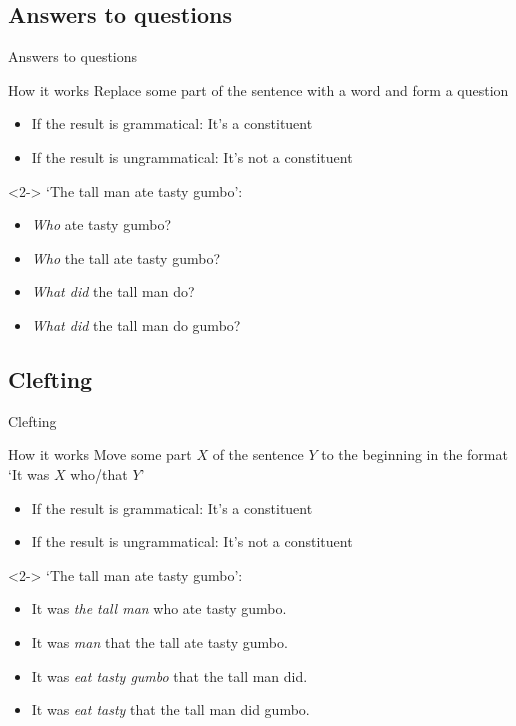 \documentclass{beamer}
\newcommand{\subonetwo}{Answers to questions}
\newcommand{\subonethree}{Clefting}
\begin{document}
    \subsection{\subonetwo}
      \begin{frame}{\subonetwo}
        \begin{block}{How it works}
          Replace some part of the sentence with a  word and form a question
          \begin{itemize}
            \item If the result is grammatical: It's a constituent
            \item If the result is ungrammatical: It's not a constituent
          \end{itemize}
        \end{block}
        \begin{example}<2->
          `The tall man ate tasty gumbo':
          \begin{itemize}
            \item \emph{Who} ate tasty gumbo?
            \item \emph{Who} the tall ate tasty gumbo?
            \item \emph{What did} the tall man do?
            \item \emph{What did} the tall man do gumbo?
          \end{itemize}
        \end{example}
      \end{frame}

    \subsection{\subonethree}
      \begin{frame}{\subonethree}
        \begin{block}{How it works}
          Move some part $X$ of the sentence $Y$ to the beginning in the format `It was $X$ who/that $Y$'
          \begin{itemize}
            \item If the result is grammatical: It's a constituent
            \item If the result is ungrammatical: It's not a constituent
          \end{itemize}
        \end{block}
        \begin{example}<2->
          `The tall man ate tasty gumbo':
          \begin{itemize}
            \item It was \emph{the tall man} who ate tasty gumbo.
            \item It was \emph{man} that the tall ate tasty gumbo.
            \item It was \emph{eat tasty gumbo} that the tall man did.
            \item It was \emph{eat tasty} that the tall man did gumbo.
          \end{itemize}
        \end{example}
      \end{frame}
\end{document}
